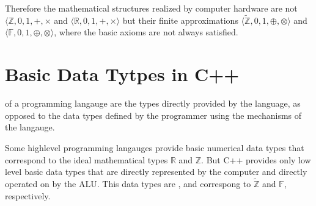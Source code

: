 \documentclass[a4paper,10pt,english]{jupyterBook}
\begin{document}
\sphinxAtStartPar
Therefore the mathematical structures realized by computer hardware are not \(\langle\mathbb{Z}, 0, 1, +, \times\) and \(\langle\mathbb{R}, 0, 1, +, \times\rangle\) but their finite approximations
\(\langle\tilde{\mathbb{Z}}, 0, 1, \oplus, \otimes\rangle\) and \(\langle\mathbb{F}, 0, 1, \oplus, \otimes\rangle\), where the basic axioms are not always satisfied.

\sphinxstepscope


\section{Basic Data Tytpes in C++}
\label{\detokenize{text/progtut/datatypes:basic-data-tytpes-in-c}}\label{\detokenize{text/progtut/datatypes::doc}}
\sphinxAtStartPar
{} of a programming langauge are the types directly provided by the language, as opposed to the data types defined by the programmer using the mechanisms of the langauge.

\sphinxAtStartPar
Some high\sphinxhyphen{}level programming langauges provide basic numerical data types that correspond to the ideal mathematical types \(\mathbb{R}\) and \(\mathbb{Z}\). But C++ provides only low level basic data types that are directly represented by the computer and directly operated on by the ALU. This data types are ,  and   correspong to \(\tilde{\mathbb{Z}}\) and \(\mathbb{F}\), respectively.
\end{document}

